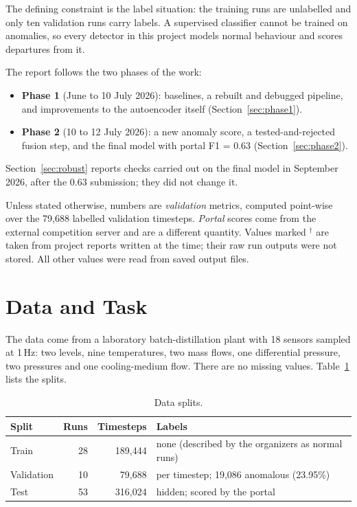 \documentclass[runningheads]{llncs}
\newcommand{\doc}{$^\dagger$}
\begin{document}
The defining constraint is the label situation: the training runs are unlabelled and only ten validation runs carry labels. A supervised classifier cannot be trained on anomalies, so every detector in this project models normal behaviour and scores departures from it.

The report follows the two phases of the work:
\begin{itemize}
  \item \textbf{Phase 1} (June to 10 July 2026): baselines, a rebuilt and debugged pipeline, and improvements to the autoencoder itself (Section~\ref{sec:phase1}).
  \item \textbf{Phase 2} (10 to 12 July 2026): a new anomaly score, a tested-and-rejected fusion step, and the final model with portal F1 = 0.63 (Section~\ref{sec:phase2}).
\end{itemize}
Section~\ref{sec:robust} reports checks carried out on the final model in September 2026, after the 0.63 submission; they did not change it.

Unless stated otherwise, numbers are \emph{validation} metrics, computed point-wise over the 79{,}688 labelled validation timesteps. \emph{Portal} scores come from the external competition server and are a different quantity. Values marked \doc{} are taken from project reports written at the time; their raw run outputs were not stored. All other values were read from saved output files.

\section{Data and Task}

The data come from a laboratory batch-distillation plant with 18 sensors sampled at 1\,Hz: two levels, nine temperatures, two mass flows, one differential pressure, two pressures and one cooling-medium flow. There are no missing values. Table~\ref{tab:data} lists the splits.

\begin{table}[ht]
\centering
\caption{Data splits.}\label{tab:data}
\begin{tabular}{lrrl}
\toprule
Split & Runs & Timesteps & Labels \\
\midrule
Train & 28 & 189{,}444 & none (described by the organizers as normal runs) \\
Validation & 10 & 79{,}688 & per timestep; 19{,}086 anomalous (23.95\%) \\
Test & 53 & 316{,}024 & hidden; scored by the portal \\
\bottomrule
\end{tabular}
\end{table}
\end{document}
